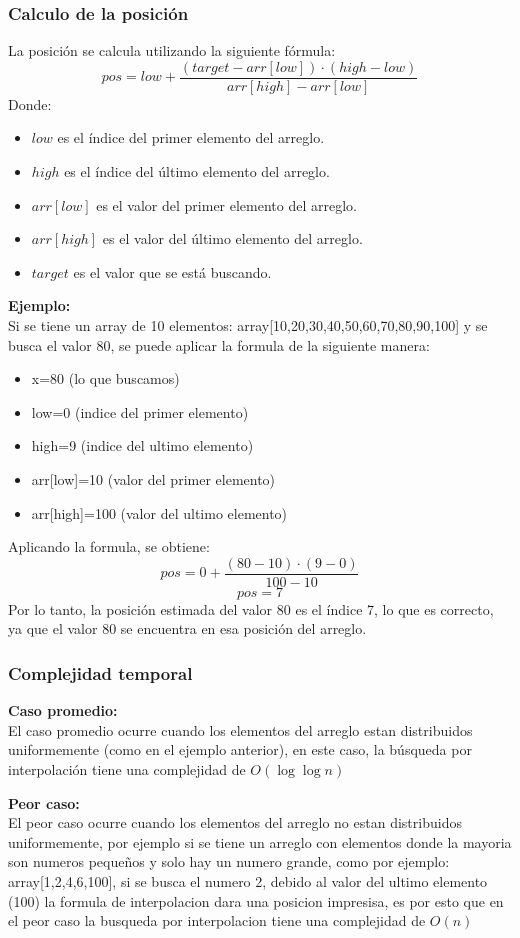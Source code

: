 \documentclass[9pt,letterpaper,onecolumn]{rho-class/rho}
\begin{document}
\subsubsection*{Calculo de la posición}
La posición se calcula utilizando la siguiente fórmula:
$$pos = low + \frac{(target - arr[low]) \cdot (high - low)}{arr[high] - arr[low]}$$
Donde:
\begin{itemize}
    \item $low$ es el índice del primer elemento del arreglo.
    \item $high$ es el índice del último elemento del arreglo.
    \item $arr[low]$ es el valor del primer elemento del arreglo.
    \item $arr[high]$ es el valor del último elemento del arreglo.
    \item $target$ es el valor que se está buscando.
\end{itemize}
\textbf{Ejemplo:}\\
Si se tiene un array de 10 elementos: array[10,20,30,40,50,60,70,80,90,100] y se busca el valor 80, se puede aplicar la formula de la siguiente 
manera:
\begin{itemize}
    \item x=80 (lo que buscamos)
    \item low=0 (indice del primer elemento)
    \item high=9 (indice del ultimo elemento)
    \item arr[low]=10 (valor del primer elemento)
    \item arr[high]=100 (valor del ultimo elemento)
\end{itemize}
Aplicando la formula, se obtiene:
$$pos = 0 +\frac{(80-10) \cdot (9-0)}{100-10}$$
$$pos = 7$$
Por lo tanto, la posición estimada del valor 80 es el índice 7, lo que es correcto, ya que el valor 80 se encuentra en esa posición del arreglo.

\subsubsection{Complejidad temporal}
\textbf{Caso promedio:}\\
El caso promedio ocurre cuando los elementos del arreglo estan distribuidos uniformemente (como en el ejemplo anterior),
en este caso, la búsqueda por interpolación tiene una complejidad de $O(\log \log n)$

\textbf{Peor caso:}\\
El peor caso ocurre cuando los elementos del arreglo no estan distribuidos uniformemente, por ejemplo si se tiene un arreglo con elementos donde
la mayoria son numeros pequeños y solo hay un numero grande, como por ejemplo: array[1,2,4,6,100], si se busca el numero 2, debido al valor
del ultimo elemento (100) la formula de interpolacion dara una posicion impresisa, es por esto que en el peor caso
la busqueda por interpolacion tiene una complejidad de $O(n)$
\end{document}
